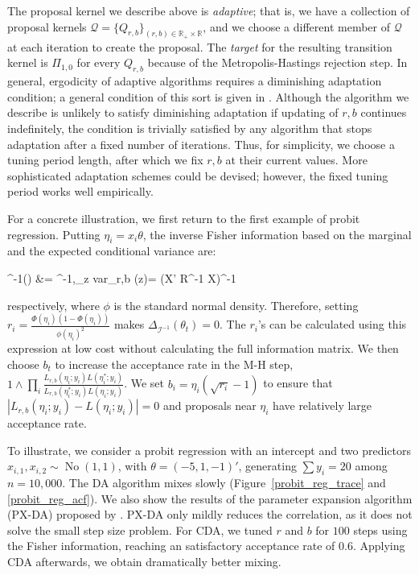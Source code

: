 \documentclass[12pt]{article}
\newcommand{\be}{\begin{equs}}
\newcommand{\ee}{\end{equs}}
\newcommand{\bb}[1]{\mathbb{#1}}
\newcommand{\mc}[1]{\mathcal{#1}}
\DeclareMathOperator{\No}{No}
\DeclareMathOperator{\diag}{diag}
\begin{document}
The proposal kernel we describe above is \emph{adaptive}; that is, we have a collection of proposal kernels $\mc Q = \{Q_{r,b}\}_{(r,b) \in \bb R_+ \times \bb R}$, and we choose a different member of $\mc Q$ at each iteration to create the proposal. The \emph{target} for the resulting transition kernel is $\Pi_{1,0}$ for every $Q_{r,b}$ because of the Metropolis-Hastings rejection step.  In general, ergodicity of adaptive algorithms requires a diminishing adaptation condition; a general condition of this sort is given in \cite{roberts2007coupling}. Although the algorithm we describe is unlikely to satisfy diminishing adaptation if updating of $r,b$ continues indefinitely, the condition is trivially satisfied by any algorithm that stops adaptation after a fixed number of iterations. Thus, for simplicity, we choose a tuning period length, after which we fix $r,b$ at their current values. More sophisticated adaptation schemes could be devised; however, the fixed tuning period works well empirically.

For a concrete illustration, we first return to the first example of probit regression. Putting $\eta_i = x_i\theta$, the inverse Fisher information based on the marginal and the expected conditional variance are:
\be
\mc I^{-1}(\theta) &= \bigg[ X'\diag\bigg\{\frac{\phi(\eta_i)^2}{ {\Phi(\eta_i)(1- \Phi(\eta_i))}}\bigg\} X \bigg]^{-1},\qquad \bb E_z \mbox{var}_{r,b} (\theta \mid z)= (X' R^{-1} X)^{-1}
\ee
respectively, where $\phi$ is the standard normal density. Therefore, setting $r_i = \frac{\Phi(\eta_i)(1- \Phi(\eta_i))} {\phi(\eta_i)^2}$ makes $\Delta_{\mc I^{-1}}(\theta_t)=0$.  The $r_i$'s can be calculated using this expression at low cost without calculating the full information matrix. We then choose $b_t$ to increase the acceptance rate in the M-H step, $1\wedge \prod_i \frac{   L_{r,b}(\eta_i;y_i) L(\eta_i^*;y_i)}{ L_{r,b}(\eta_i^*;y_i)L(\eta_i;y_i) }$. %
We set $b_i = \eta_i (\sqrt{r_i}-1)$ to ensure that $|L_{r,b}(\eta_i;y_i) - L(\eta_i;y_i)|=0$ and proposals near $\eta_i$ have relatively large acceptance rate.

To illustrate, we consider a probit regression with an intercept and two predictors $x_{i,1},x_{i,2}\sim \No(1,1)$, with $\theta=(-5,1,-1)'$, generating $\sum y_i=20$ among $n=10,000$. The \cite{albert1993bayesian} DA algorithm mixes slowly (Figure~\ref{probit_reg_trace} and \ref{probit_reg_acf}). We also show the 
results of the parameter expansion algorithm (PX-DA) proposed by \cite{liu1999parameter}. PX-DA only mildly reduces the correlation, as it does not solve the small step size problem.  For CDA, we tuned $r$ and $b$ for $100$ steps using the Fisher information, reaching an satisfactory acceptance rate of $0.6$. Applying CDA afterwards, we obtain dramatically better mixing. 
\end{document}
